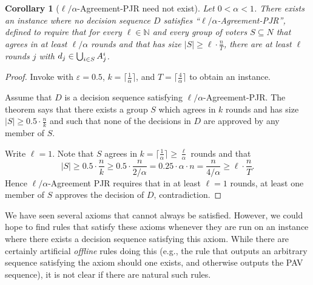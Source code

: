 \documentclass[10pt]{scrartcl}
\theoremstyle{plain}
\newtheorem{corollary}[theorem]{Corollary}
\theoremstyle{definition}
\renewcommand*{\ge}{\geqslant}
\renewcommand*{\geq}{\geqslant}
\renewcommand{\epsilon}{\varepsilon}
\begin{document}
\begin{corollary}[$\ell/\alpha$-Agreement-PJR need not exist]
	Let $0 < \alpha < 1$. There exists an instance where no decision sequence $D$ satisfies  ``\emph{$\ell/\alpha$-Agreement-PJR}'',
	defined to require that for every $\ell \in \mathbb N$ and every group of voters $S \subseteq N$ that agrees in at least $\ell/\alpha$ rounds and that has size $|S| \geq \ell \cdot \frac{n}{T}$, there are at least $\ell$ rounds $j$ with $d_j \in \bigcup_{i \in S} \smash{A_j^i}$.
\end{corollary}
\begin{proof}
	Invoke  with $\epsilon=0.5$, $k = \lceil\frac{1}{\alpha}\rceil$, and $T=\lceil\frac{4}{\alpha}\rceil$ to obtain an instance. 
	
	Assume that $D$ is a decision sequence satisfying $\ell/\alpha$-Agreement-PJR. The theorem says that there exists a group $S$ which agrees in $k$ rounds and has size $|S| \ge 0.5 \cdot \frac{n}{k}$ and such that none of the decisions in $D$ are approved by any member of $S$.
	
	Write $\ell = 1$. Note that $S$ agrees in $k = \lceil\frac{1}{\alpha}\rceil \ge \frac{\ell}{\alpha}$ rounds and that
	\[
	|S| 
	\ge 0.5 \cdot \frac{n}{k} 
	\ge 0.5 \cdot \frac{n}{2/\alpha} 
	= 0.25 \cdot \alpha \cdot n 
	= \frac{n}{4/\alpha} 
	\ge \ell \cdot \frac{n}{T}.
	\]
	Hence $\ell/\alpha$-Agreement PJR requires that in at least $\ell = 1$ rounds, at least one member of $S$ approves the decision of $D$, contradiction.
\end{proof}


We have seen several axioms that cannot always be satisfied. However, we could hope to find rules that satisfy these axioms whenever they are run on an instance where there exists a decision sequence satisfying this axiom. While there are certainly artificial \emph{offline} rules doing this (e.g., the rule that outputs an arbitrary sequence satisfying the axiom should one exists, and otherwise outputs the PAV sequence), it is not clear if there are natural such rules. 
\end{document}
